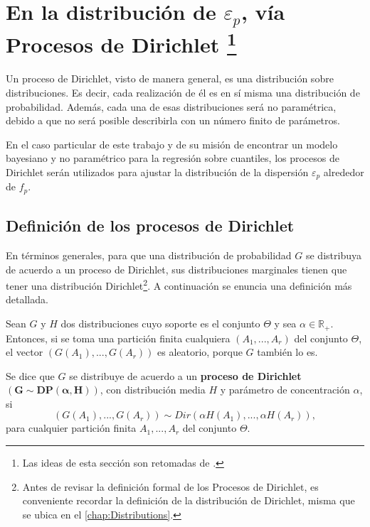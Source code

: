 \section[En la distribuci\'on de $\varepsilon_p$, v\'ia procesos de Dirichlet]{
    En la distribuci\'on de $\varepsilon_p$, v\'ia Procesos de Dirichlet
    \footnote{Las ideas de esta secci\'on son retomadas de \cite{Yee_DirProc}.}
}

Un proceso de Dirichlet, visto de manera general, es una distribuci\'on sobre distribuciones. Es decir, cada realizaci\'on de él es en sí misma una distribuci\'on de probabilidad. Adem\'as, cada una de esas distribuciones ser\'a no param\'etrica, debido a que no ser\'a posible describirla con un n\'umero finito de par\'ametros.

En el caso particular de este trabajo y de su misi\'on de encontrar un modelo bayesiano y no param\'etrico para la regresi\'on sobre cuantiles, los procesos de Dirichlet ser\'an utilizados para ajustar la distribuci\'on de la dispersi\'on $\varepsilon_p$ alrededor de $f_p$.

\subsection{Definici\'on de los procesos de Dirichlet}

En t\'erminos generales, para que una distribuci\'on de probabilidad $G$ se distribuya de acuerdo a un proceso de Dirichlet, sus distribuciones marginales tienen que tener una distribuci\'on Dirichlet\footnote{Antes de revisar la definici\'on formal de los Procesos de Dirichlet, es conveniente recordar la definici\'on de la distribuci\'on de Dirichlet, misma que se ubica en el \autoref{chap:Distributions}.}. A continuaci\'on se enuncia una definici\'on m\'as detallada.

\begin{defin}
    Sean $G$ y $H$ dos distribuciones cuyo soporte es el conjunto $\Theta$ y sea $\alpha \in \mathbb{R}_+$. Entonces, si se toma una partici\'on finita cualquiera $(A_1,...,A_r)$ del conjunto $\Theta$, el vector $(G(A_1),...,G(A_r))$ es aleatorio, porque $G$ tambi\'en lo es.
    
    Se dice que $G$ se distribuye de acuerdo a un \textbf{proceso de Dirichlet} $\bm{(G \sim DP(\alpha,H))}$, con distribuci\'on media $H$ y par\'ametro de concentraci\'on $\alpha$, si
    \begin{equation*}
        (G(A_1),...,G(A_r)) \sim Dir(\alpha H(A_1),...,\alpha H(A_r)), 
    \end{equation*}
    para cualquier partici\'on finita $A_1,...,A_r$ del conjunto $\Theta$.
\end{defin}

